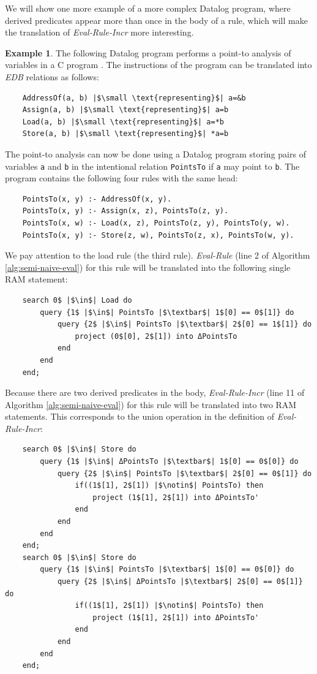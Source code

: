 \documentclass[11pt]{report}
\theoremstyle{definition}
\newtheorem{exmp}{Example}[chapter]
\begin{document}
We will show one more example of a more complex Datalog program, where derived predicates appear more than once in the body of a rule, which will make the translation of \textit{Eval-Rule-Incr} more interesting.

\begin{exmp}
  The following Datalog program performs a point-to analysis of variables in a C program \cite{PGL-014}. The instructions of the program can be translated into \textit{EDB} relations as follows:
  \begin{verbatim}
    AddressOf(a, b) |$\small \text{representing}$| a=&b
    Assign(a, b) |$\small \text{representing}$| a=b
    Load(a, b) |$\small \text{representing}$| a=*b
    Store(a, b) |$\small \text{representing}$| *a=b
  \end{verbatim}
  The point-to analysis can now be done using a Datalog program storing pairs of variables \texttt{a} and \texttt{b} in the intentional relation \texttt{PointsTo} if \texttt{a} may point to \texttt{b}. The program contains the following four rules with the same head:
  \begin{verbatim}
    PointsTo(x, y) :- AddressOf(x, y).
    PointsTo(x, y) :- Assign(x, z), PointsTo(z, y).
    PointsTo(x, w) :- Load(x, z), PointsTo(z, y), PointsTo(y, w).
    PointsTo(x, y) :- Store(z, w), PointsTo(z, x), PointsTo(w, y).
  \end{verbatim}
  We pay attention to the load rule (the third rule). \textit{Eval-Rule} (line 2 of Algorithm \ref{alg:semi-naive-eval}) for this rule will be translated into the following single RAM statement:
  \begin{verbatim}
    search 0$ |$\in$| Load do
        query {1$ |$\in$| PointsTo |$\textbar$| 1$[0] == 0$[1]} do
            query {2$ |$\in$| PointsTo |$\textbar$| 2$[0] == 1$[1]} do
                project (0$[0], 2$[1]) into ΔPointsTo
            end
        end
    end;
  \end{verbatim}
  Because there are two derived predicates in the body, \textit{Eval-Rule-Incr} (line 11 of Algorithm \ref{alg:semi-naive-eval}) for this rule will be translated into two RAM statements. This corresponds to the union operation in the definition of \textit{Eval-Rule-Incr}:
  \begin{verbatim}
    search 0$ |$\in$| Store do
        query {1$ |$\in$| ΔPointsTo |$\textbar$| 1$[0] == 0$[0]} do
            query {2$ |$\in$| PointsTo |$\textbar$| 2$[0] == 0$[1]} do
                if((1$[1], 2$[1]) |$\notin$| PointsTo) then
                    project (1$[1], 2$[1]) into ΔPointsTo'
                end
            end
        end
    end;
    search 0$ |$\in$| Store do
        query {1$ |$\in$| PointsTo |$\textbar$| 1$[0] == 0$[0]} do
            query {2$ |$\in$| ΔPointsTo |$\textbar$| 2$[0] == 0$[1]} do
                if((1$[1], 2$[1]) |$\notin$| PointsTo) then
                    project (1$[1], 2$[1]) into ΔPointsTo'
                end
            end
        end
    end;
  \end{verbatim}
\end{exmp}
\label{exmp:point-to}
\end{document}
